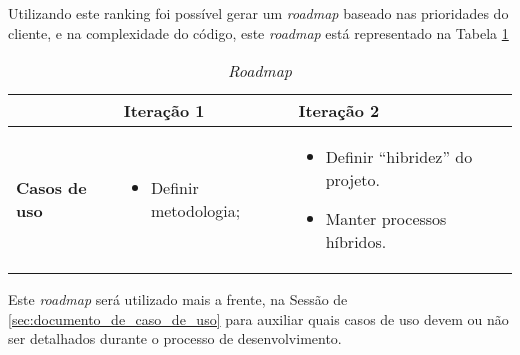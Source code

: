 Utilizando este ranking foi possível gerar um \textit{roadmap} baseado nas prioridades do cliente, e na complexidade do código, este \textit{roadmap} está representado na Tabela \ref{tab:primeiro_roadmap}  

\vspace{5mm}
\begin{table}[H]
\centering
\begin{tabular}{p{1cm}|p{6cm}|p{}|}

\cline{2-3} &
\textbf{Iteração 1} &
\textbf{Iteração 2}
\\ \hline
\multicolumn{1}{|p{1cm}|}{\textbf{Casos de uso}} &
\begin{itemize}
 	\item Definir metodologia;
\end{itemize} &
\begin{itemize}
	\item Definir ``hibridez'' do projeto.
 	\item Manter processos híbridos.
 \end{itemize} 
 \\ \hline
\end{tabular}
\caption{\textit{Roadmap}}
\label{tab:primeiro_roadmap}
\end{table}

Este \textit{roadmap} será utilizado mais a frente, na Sessão de \ref{sec:documento_de_caso_de_uso} para auxiliar quais casos de uso devem ou não ser detalhados durante o processo de desenvolvimento.